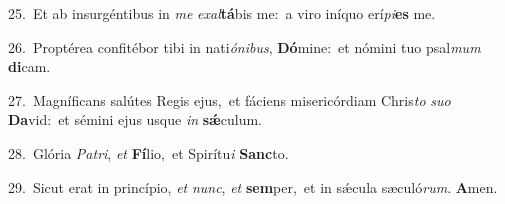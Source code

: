 {\numbfont\textcolor{\numbcolor}{25.}}~Et ab insurgéntibus in \textit{me} \textit{ex}\-\textit{al}\textbf{tá}bis me:~\star a viro iníquo erí\-\textit{pi}\-\textbf{es} me.\par
{\numbfont\textcolor{\numbcolor}{26.}}~Proptérea confitébor tibi in nati\-\textit{ó}\-\textit{ni}\textit{bus}, \textbf{Dó}\-mine:~\star et nómini tuo psal\textit{mum} \textbf{di}\-cam.\par
{\numbfont\textcolor{\numbcolor}{27.}}~Magníficans salútes Regis ejus,~\dagger et fáciens misericórdiam Chris\textit{to} \textit{su}\-\textit{o} \textbf{Da}\-vid:~\star et sémini ejus usque \textit{in} \textbf{sǽ}\-culum.\par
{\numbfont\textcolor{\numbcolor}{28.}}~Glória \textit{Pa}\-\textit{tri}, \textit{et} \textbf{Fí}\-lio,~\star et Spirítu\textit{i} \textbf{Sanc}\-to.\par
{\numbfont\textcolor{\numbcolor}{29.}}~Sicut erat in princípio, \textit{et} \textit{nunc}\-, \textit{et} \textbf{sem}\-per,~\star et in sǽcula sæculó\-\textit{rum}\-. \textbf{A}\-men.\par
